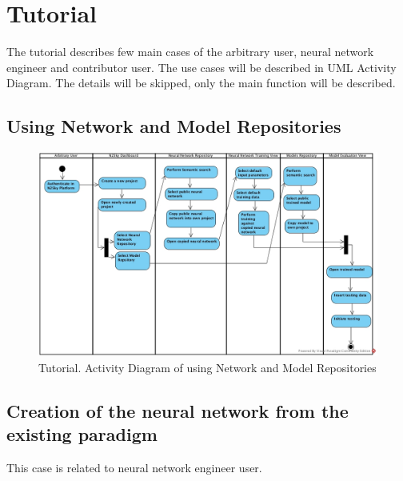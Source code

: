 \section{Tutorial}\label{Tutorial}

The tutorial describes few main cases of the arbitrary user, neural network engineer and contributor user. The use cases will be described in UML  Activity Diagram. The details will be skipped, only the main function will be described.  

\subsection{Using Network and Model Repositories}\label{Using Network and Model Repositories}

\begin{figure}[htbp]
\begin{center}
  \includegraphics[width=\linewidth]{components/tutorial/img/training_arbitrary.jpg}
  \caption{Tutorial. Activity Diagram of using Network and Model Repositories}
  \label{fig:training_arbitrary}
\end{center}
\end{figure} 

\subsection{Creation of the neural network from the existing paradigm}\label{Creation of the neural network from the existing paradigm}

This case is related to neural network engineer user. 

